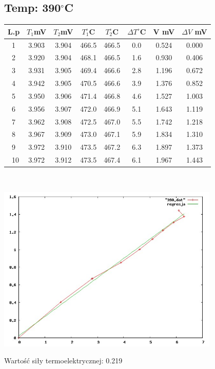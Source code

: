 \documentclass[a4paper,12pt]{article}
\begin{document}
\subsection{Temp: 390$^\circ$C}
\begin{tabular}{|c|c|c|c|c|c|c|c|}
\hline
L.p&$T_1$mV&$T_2$mV&$T_1^\circ$C&$T_2^\circ$C&$\Delta T^\circ$C&V mV&$\Delta V$ mV\\
\hline
1&3.903&3.904&466.5&466.5&0.0&0.524&0.000\\
2&3.920&3.904&468.1&466.5&1.6&0.930&0.406\\
3&3.931&3.905&469.4&466.6&2.8&1.196&0.672\\
4&3.942&3.905&470.5&466.6&3.9&1.376&0.852\\
5&3.950&3.906&471.4&466.8&4.6&1.527&1.003\\
6&3.956&3.907&472.0&466.9&5.1&1.643&1.119\\
7&3.962&3.908&472.5&467.0&5.5&1.742&1.218\\
8&3.967&3.909&473.0&467.1&5.9&1.834&1.310\\
9&3.972&3.910&473.5&467.2&6.3&1.897&1.373\\\
10&3.972&3.912&473.5&467.4&6.1&1.967&1.443\\
\hline
\end{tabular}\\
\begin{center}
\includegraphics[width=400px]{390}
\end{center}

Wartość siły termoelektrycznej: 0.219
\end{document}
